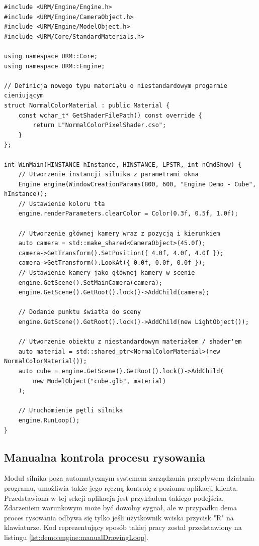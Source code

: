\begin{lstlisting}[caption={Pełny kod programu wykorzystującego API silnika do wyświetlenia trzech sześcianów o różnych materiałach.}, label={lst:demo:engine:cube}]
#include <URM/Engine/Engine.h>
#include <URM/Engine/CameraObject.h>
#include <URM/Engine/ModelObject.h>
#include <URM/Core/StandardMaterials.h>

using namespace URM::Core;
using namespace URM::Engine;

// Definicja nowego typu materiału o niestandardowym progarmie cieniującym
struct NormalColorMaterial : public Material {
	const wchar_t* GetShaderFilePath() const override { 
		return L"NormalColorPixelShader.cso";
	}
};
	
int WinMain(HINSTANCE hInstance, HINSTANCE, LPSTR, int nCmdShow) {
	// Utworzenie instancji silnika z parametrami okna
	Engine engine(WindowCreationParams(800, 600, "Engine Demo - Cube", hInstance));
	// Ustawienie koloru tła
	engine.renderParameters.clearColor = Color(0.3f, 0.5f, 1.0f);
	
	// Utworzenie głównej kamery wraz z pozycją i kierunkiem
	auto camera = std::make_shared<CameraObject>(45.0f);
	camera->GetTransform().SetPosition({ 4.0f, 4.0f, 4.0f });
	camera->GetTransform().LookAt({ 0.0f, 0.0f, 0.0f });
	// Ustawienie kamery jako głównej kamery w scenie
	engine.GetScene().SetMainCamera(camera);
	engine.GetScene().GetRoot().lock()->AddChild(camera);
	
	// Dodanie punktu światła do sceny
	engine.GetScene().GetRoot().lock()->AddChild(new LightObject());
	
	// Utworzenie obiektu z niestandardowym materiałem / shader'em
	auto material = std::shared_ptr<NormalColorMaterial>(new NormalColorMaterial());
	auto cube = engine.GetScene().GetRoot().lock()->AddChild(
		new ModelObject("cube.glb", material)
	);
	
	// Uruchomienie pętli silnika
	engine.RunLoop();
}
\end{lstlisting}

\subsection{Manualna kontrola procesu rysowania}
Moduł silnika poza automatycznym systemem zarządzania przepływem działania programu, umożliwia także jego ręczną kontrolę z poziomu aplikacji klienta. Przedstawiona w tej sekcji aplikacja jest przykładem takiego podejścia. Zdarzeniem warunkowym może być dowolny sygnał, ale w przypadku dema proces rysowania odbywa się tylko jeśli użytkownik wciska przycisk "R" na klawiaturze. Kod reprezentujący sposób takiej pracy został przedstawiony na listingu \ref{lst:demo:engine:manualDrawingLoop}.

